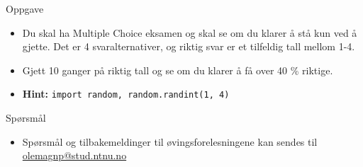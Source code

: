 \documentclass[screen, aspectratio=169]{beamer}
\begin{document}
\begin{frame}{Oppgave}
	\begin{itemize}
		\item Du skal ha Multiple Choice eksamen og skal se om du klarer å stå kun ved å gjette. Det er 4 svaralternativer, og riktig svar er et tilfeldig tall mellom 1-4.
		\item Gjett 10 ganger på riktig tall og se om du klarer å få over 40 \% riktige.
		\item<+-> \textbf{Hint:} \lstinline|import random, random.randint(1, 4)|
	\end{itemize}
\end{frame}

\begin{frame}{Spørsmål}
	\begin{itemize}
		\item Spørsmål og tilbakemeldinger til øvingsforelesningene kan sendes til \href{mailto::olemagnp@stud.ntnu.no}{olemagnp@stud.ntnu.no}
	\end{itemize}
\end{frame}
\end{document}
